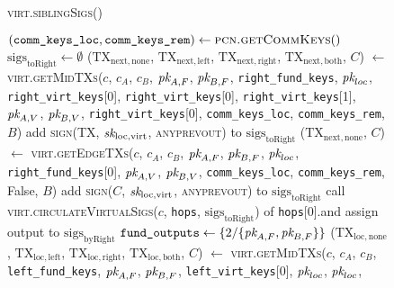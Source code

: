 \begin{figure}[H]
  \begin{processbox}{\textsc{virt.siblingSigs}()}
    \begin{algorithmic}[1]
      \State $(\texttt{comm\_keys\_loc}, \texttt{comm\_keys\_rem}) \gets
      \textsc{pcn.getCommKeys}()$
      \State $\mathrm{sigs}_{\mathrm{toRight}} \gets \emptyset$
       
        \State ($\mathrm{TX}_{\mathrm{next}, \mathrm{none}}$,
        $\mathrm{TX}_{\mathrm{next}, \mathrm{left}}$,
        $\mathrm{TX}_{\mathrm{next}, \mathrm{right}}$,
        $\mathrm{TX}_{\mathrm{next}, \mathrm{both}}$, $C$) $\gets$
        \textsc{virt.getMidTXs}($c$, $c_A$, $c_B$, $\textit{pk}_{A, F}$, $\textit{pk}_{B, F}$,
        \texttt{right\_fund\_keys}, $\textit{pk}_{loc}$,
        \texttt{right\_virt\_keys}[0], \texttt{right\_virt\_keys}[0],
        \texttt{right\_virt\_keys}[1], $\textit{pk}_{A, V}$, $\textit{pk}_{B, V}$,
        \texttt{right\_virt\_keys}[0], \texttt{comm\_keys\_loc},
        \texttt{comm\_keys\_rem}, $B$)
          \State add \textsc{sign}(TX, $\textit{sk}_{\mathrm{loc}, \mathrm{virt}}$,
          \textsc{anyprevout}) to $\mathrm{sigs}_{\mathrm{toRight}}$
        \EndFor
      \Else \: 
        \State ($\mathrm{TX}_{\mathrm{next}, \mathrm{none}}$, $C$) $\gets$
        \textsc{virt.getEdgeTXs}($c$, $c_A$, $c_B$, $\textit{pk}_{A, F}$, $\textit{pk}_{B, F}$,
        $\textit{pk}_{loc}$, \texttt{right\_fund\_keys}[0], $\textit{pk}_{A, V}$, $\textit{pk}_{B, V}$,
        \texttt{comm\_keys\_loc}, \texttt{comm\_keys\_rem}, False, $B$)
        \State add \textsc{sign}($C$, $\textit{sk}_{\mathrm{loc}, \mathrm{virt}}$,
        \textsc{anyprevout}) to $\mathrm{sigs}_{\mathrm{toRight}}$
      \EndIf
      \State call \textsc{virt.circulateVirtualSigs}($c$, \texttt{hops},
      $\mathrm{sigs}_{\mathrm{toRight}}$) of \texttt{hops}[0].\bob and assign
      output to $\mathrm{sigs}_{\mathrm{byRight}}$
      \State $\texttt{fund\_outputs} \gets \{ 2/\{\textit{pk}_{A, F}, \textit{pk}_{B, F}\} \}$
      \State ($\mathrm{TX}_{\mathrm{loc}, \mathrm{none}}$,
      $\mathrm{TX}_{\mathrm{loc}, \mathrm{left}}$, $\mathrm{TX}_{\mathrm{loc},
      \mathrm{right}}$, $\mathrm{TX}_{\mathrm{loc}, \mathrm{both}}$, $C$)
      $\gets$ \textsc{virt.getMidTXs}($c$, $c_A$, $c_B$,
      \texttt{left\_fund\_keys}, $\textit{pk}_{A, F}$, $\textit{pk}_{B, F}$,
      \texttt{left\_virt\_keys}[0], $\textit{pk}_{loc}$, $\textit{pk}_{loc}$,

\end{algorithmic}
\end{processbox}
\end{figure}
